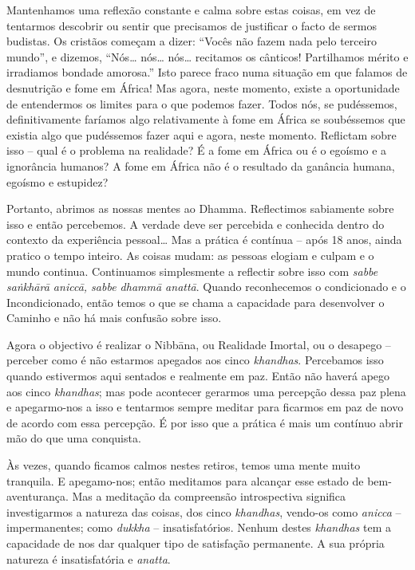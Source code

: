 Mantenhamos uma reflexão constante e calma sobre estas coisas, em vez de
tentarmos descobrir ou sentir que precisamos de justificar o facto de sermos
budistas. Os cristãos começam a dizer: ``Vocês não fazem nada pelo terceiro
mundo'', e dizemos, ``Nós\ldots{} nós\ldots{} nós\ldots{} recitamos os cânticos!
Partilhamos mérito e irradiamos bondade amorosa.'' Isto parece fraco numa
situação em que falamos de desnutrição e fome em África! Mas agora, neste
momento, existe a oportunidade de entendermos os limites para o que podemos
fazer. Todos nós, se pudéssemos, definitivamente faríamos algo relativamente à
fome em África se soubéssemos que existia algo que pudéssemos fazer aqui e
agora, neste momento. Reflictam sobre isso -- qual é o problema na realidade? É
a fome em África ou é o egoísmo e a ignorância humanos? A fome em África não é o
resultado da ganância humana, egoísmo e estupidez?

Portanto, abrimos as nossas mentes ao Dhamma. Reflectimos sabiamente
sobre isso e então percebemos. A verdade deve ser percebida e conhecida dentro
do contexto da experiência pessoal\ldots{} Mas a prática é contínua -- após 18
anos, ainda pratico o tempo inteiro. As coisas mudam: as pessoas elogiam e
culpam e o mundo continua. Continuamos simplesmente a reflectir sobre isso com
\emph{sabbe saṅkhārā aniccā, sabbe dhammā anattā}. Quando reconhecemos o
condicionado e o Incondicionado, então temos o que se chama a capacidade para
desenvolver o Caminho e não há mais confusão sobre isso.

Agora o objectivo é realizar o Nibbāna, ou Realidade Imortal, ou o
desapego -- perceber como é não estarmos apegados aos cinco \emph{khandhas}.
Percebamos isso quando estivermos aqui sentados e realmente em paz. Então não
haverá apego aos cinco \emph{khandhas}; mas pode acontecer gerarmos uma
percepção dessa paz plena e apegarmo-nos a isso e tentarmos sempre meditar para
ficarmos em paz de novo de acordo com essa percepção. É por isso que a prática é
mais um contínuo abrir mão do que uma conquista.

Às vezes, quando ficamos calmos nestes retiros, temos uma mente muito tranquila.
E apegamo-nos; então meditamos para alcançar esse estado de bem-aventurança. Mas
a meditação da compreensão introspectiva significa investigarmos a natureza das
coisas, dos cinco \emph{khandhas}, vendo-os como \emph{anicca} -- impermanentes;
como \emph{dukkha} -- insatisfatórios. Nenhum destes \emph{khandhas} tem a
capacidade de nos dar qualquer tipo de satisfação permanente. A sua própria
natureza é insatisfatória e \emph{anatta}.

